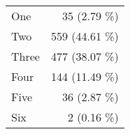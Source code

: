 \begin{tabular}{ l  r }
One & 35 (2.79 \%)\\
Two & 559 (44.61 \%)\\
Three & 477 (38.07 \%)\\
Four & 144 (11.49 \%)\\
Five & 36 (2.87 \%)\\
Six & 2 (0.16 \%)\\
\end{tabular}